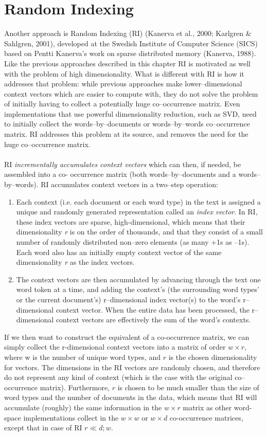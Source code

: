 \newpage
\section{Random Indexing}\label{RI}
Another approach is Random Indexing (RI) (Kanerva et al., 2000; Karlgren \& Sahlgren, 2001), developed
 at the Swedish Institute of Computer Science (SICS) based on Pentti Kanerva's work on sparse
 distributed memory (Kanerva, 1988). Like the previous approaches described in 
this chapter RI 
is motivated as well with the problem of high dimensionality. What is different with RI is how it addresses 
that problem: while previous approaches make lower--dimensional context vectors which are
 easier to compute with, they do not solve the problem of initially having to collect a potentially
 huge co--occurrence matrix. Even implementations that use powerful dimensionality reduction, such
as SVD, need to initially collect the words--by--documents or words--by--words co--occurrence
matrix. RI addresses this problem at its source, and removes the need for the huge co--occurrence 
matrix.
\\\\
RI \textit{incrementally accumulates context vectors} which can then, if needed, be assembled into a co-
occurrence matrix (both words--by--documents and a words--by--words). RI accumulates context vectors 
in a two--step operation:
\begin{enumerate}
\item Each context (i.e. each document or each word type) in the text is assigned a
unique and randomly generated representation called an \textit{index vector}. In RI,
these index vectors are sparse, high-dimensional, which means
that their dimensionality \emph{r} is on the order of thousands, and that they consist of a small number 
 of randomly distributed non--zero elements (as many +1s as --1s). Each word also has an initially
 empty context vector of the same dimensionality \emph{r} as the index vectors.
\item The context vectors are then accumulated by advancing through the text one word token at 
a time, and adding the context's (the surrounding word types' or the current document's)
 r--dimensional index vector(s) to the word's r--dimensional context vector. When the entire data 
has been processed, the r--dimensional context vectors are effectively the sum of the word's contexts.
\end{enumerate}

If we then want to construct the equivalent of a co-occurrence matrix, we can simply
collect the r-dimensional context vectors into a matrix of order $w\times r$, where w
 is the number of unique word types, and $r$ is the chosen dimensionality for vectors. The dimensions in 
the RI vectors are randomly chosen, and therefore do not represent any kind of context (which is the case with the original co--occurrence matrix). Furthermore,
$r$ is chosen to be much smaller than the size of word types and the number of
documents in the data, which means that RI will accumulate (roughly) the same
information in the $w\times r$ matrix as other word-space implementations collect in the
 $w\times w$ or  $w\times d$ co-occurrence matrices, except that in case of RI $r \ll d;w$.

